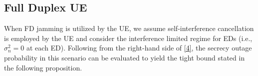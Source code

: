 \documentclass[10pt]{IEEEtran}
\begin{document}


\subsection{Full Duplex UE}

When FD jamming is utilized by the UE, we assume self-interference cancellation is employed by the UE and consider the interference limited regime for EDs (i.e., $\sigma_n^2 = 0$ at each ED).  Following from the right-hand side of \eqref{4}, the secrecy outage probability in this scenario can be evaluated to yield the tight bound stated in the following proposition.
\end{document}
